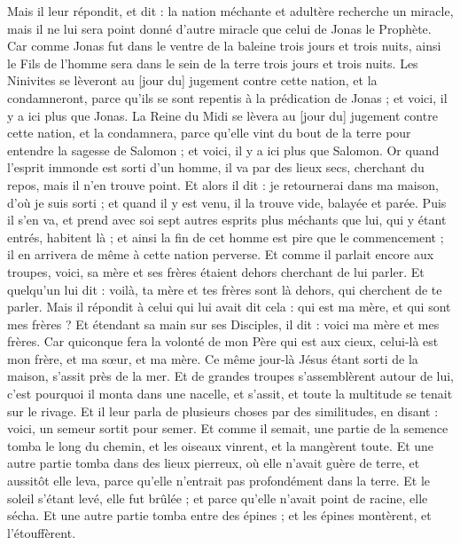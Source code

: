 \begin{multicols}{2}
Mais il leur répondit, et dit : la nation méchante et adultère recherche un miracle, mais il ne lui sera point donné d'autre miracle que celui de Jonas le Prophète.
Car comme Jonas fut dans le ventre de la baleine trois jours et trois nuits, ainsi le Fils de l'homme sera dans le sein de la terre trois jours et trois nuits.
Les Ninivites se lèveront au [jour du] jugement contre cette nation, et la condamneront, parce qu'ils se sont repentis à la prédication de Jonas ; et voici, il y a ici plus que Jonas.
La Reine du Midi se lèvera au [jour du] jugement contre cette nation, et la condamnera, parce qu'elle vint du bout de la terre pour entendre la sagesse de Salomon ; et voici, il y a ici plus que Salomon.
Or quand l'esprit immonde est sorti d'un homme, il va par des lieux secs, cherchant du repos, mais il n'en trouve point.
Et alors il dit : je retournerai dans ma maison, d'où je suis sorti ; et quand il y est venu, il la trouve vide, balayée et parée.
Puis il s'en va, et prend avec soi sept autres esprits plus méchants que lui, qui y étant entrés, habitent là ; et ainsi la fin de cet homme est pire que le commencement ; il en arrivera de même à cette nation perverse.
Et comme il parlait encore aux troupes, voici, sa mère et ses frères étaient dehors cherchant de lui parler.
Et quelqu'un lui dit : voilà, ta mère et tes frères sont là dehors, qui cherchent de te parler.
Mais il répondit à celui qui lui avait dit cela : qui est ma mère, et qui sont mes frères ?
Et étendant sa main sur ses Disciples, il dit : voici ma mère et mes frères.
Car quiconque fera la volonté de mon Père qui est aux cieux, celui-là est mon frère, et ma sœur, et ma mère.
\VerseOne{}Ce même jour-là Jésus étant sorti de la maison, s'assit près de la mer.
Et de grandes troupes s'assemblèrent autour de lui, c'est pourquoi il monta dans une nacelle, et s'assit, et toute la multitude se tenait sur le rivage.
Et il leur parla de plusieurs choses par des similitudes, en disant : voici, un semeur sortit pour semer.
Et comme il semait, une partie de la semence tomba le long du chemin, et les oiseaux vinrent, et la mangèrent toute.
Et une autre partie tomba dans des lieux pierreux, où elle n'avait guère de terre, et aussitôt elle leva, parce qu'elle n'entrait pas profondément dans la terre.
Et le soleil s'étant levé, elle fut brûlée ; et parce qu'elle n'avait point de racine, elle sécha.
Et une autre partie tomba entre des épines ; et les épines montèrent, et l'étouffèrent.

\end{multicols}
